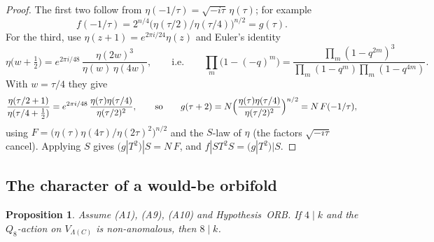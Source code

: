 \documentclass[11pt]{amsart}
\newtheorem{proposition}[theorem]{Proposition}
\theoremstyle{definition}
\begin{document}
\begin{proof}
The first two follow from $\eta(-1/\tau)=\sqrt{-i\tau}\,\eta(\tau)$; for example
\[
  f(-1/\tau)=2^{n/4}\bigl(\eta(\tau/2)/\eta(\tau/4)\bigr)^{n/2}=g(\tau).
\]
For the third, use
$\eta(z+1)=e^{2\pi i/24}\eta(z)$ and Euler's identity
\[
  \eta\bigl(w+\tfrac12\bigr)=e^{2\pi i/48}\,\frac{\eta(2w)^3}{\eta(w)\,\eta(4w)},\qquad\text{i.e.}\qquad
  \prod_m\bigl(1-(-q)^m\bigr)=\frac{\prod_m(1-q^{2m})^3}{\prod_m(1-q^m)\prod_m(1-q^{4m})}.
\]
With $w=\tau/4$ they give
\[
  \frac{\eta(\tau/2+1)}{\eta(\tau/4+\frac12)}=e^{2\pi i/48}\,\frac{\eta(\tau)\eta(\tau/4)}{\eta(\tau/2)^2},
  \qquad\text{so}\qquad
  g(\tau+2)=N\Bigl(\frac{\eta(\tau)\eta(\tau/4)}{\eta(\tau/2)^2}\Bigr)^{n/2}=N\,F(-1/\tau),
\]
using $F=\bigl(\eta(\tau)\eta(4\tau)/\eta(2\tau)^2\bigr)^{n/2}$ and the $S$-law of $\eta$ (the factors
$\sqrt{-i\tau}$ cancel). Applying $S$ gives $(g|T^2)|S=N\,F$, and $f|ST^2S=(g|T^2)|S$.
\end{proof}

\subsection{The character of a would-be orbifold}

\begin{proposition}\label{prop:Sdefect}
Assume (A1), (A9), (A10) and Hypothesis~ORB. If $4\mid k$ and the $Q_8$-action on $V_{\Lambda(C)}$ is
non-anomalous, then $8\mid k$.
\end{proposition}
\end{document}
